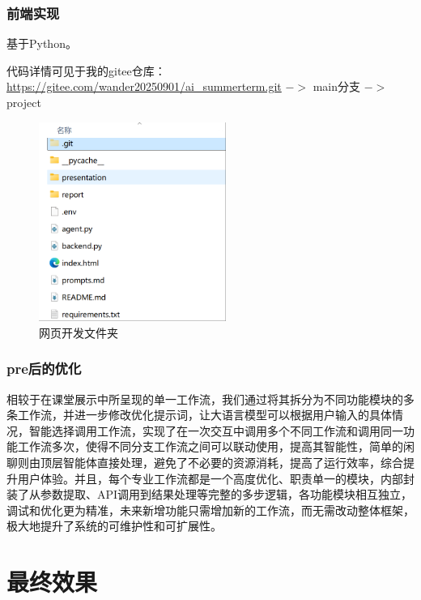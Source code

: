 \documentclass[a4paper,UTF8]{ctexart}
\begin{document}
\subsubsection{前端实现}
基于Python。
\par
代码详情可见于我的gitee仓库：\url{https://gitee.com/wander20250901/ai_summerterm.git} $->$ main分支 $->$ project
\begin{figure}[H]
    \centering
    \includegraphics[width=0.55\linewidth, height=6.5cm]{5-1.png}
    \caption{网页开发文件夹}
    \label{fig:diet_recommend}
\end{figure}

\subsubsection{pre后的优化}
相较于在课堂展示中所呈现的单一工作流，我们通过将其拆分为不同功能模块的多条工作流，并进一步修改优化提示词，让大语言模型可以根据用户输入的具体情况，智能选择调用工作流，实现了在一次交互中调用多个不同工作流和调用同一功能工作流多次，使得不同分支工作流之间可以联动使用，提高其智能性，简单的闲聊则由顶层智能体直接处理，避免了不必要的资源消耗，提高了运行效率，综合提升用户体验。并且，每个专业工作流都是一个高度优化、职责单一的模块，内部封装了从参数提取、API调用到结果处理等完整的多步逻辑，各功能模块相互独立，调试和优化更为精准，未来新增功能只需增加新的工作流，而无需改动整体框架，极大地提升了系统的可维护性和可扩展性。


\section{最终效果}
\end{document}
